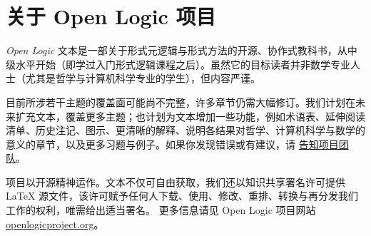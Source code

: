 \chapter*{关于 Open Logic 项目}


\textit{Open Logic} 文本是一部关于形式元逻辑与形式方法的开源、协作式教科书，从中级水平开始（即学过入门形式逻辑课程之后）。虽然它的目标读者并非数学专业人士（尤其是哲学与计算机科学专业的学生），但内容严谨。

目前所涉若干主题的覆盖面可能尚不完整，许多章节仍需大幅修订。我们计划在未来扩充文本，覆盖更多主题；也计划为文本增加一些功能，例如术语表、延伸阅读清单、历史注记、图示、更清晰的解释、说明各结果对哲学、计算机科学与数学的意义的章节，以及更多习题与例子。如果你发现错误或有建议，请
\href{https://github.com/OpenLogicProject/OpenLogic/wiki/Contributing}{告知项目团队}。

项目以开源精神运作。文本不仅可自由获取，我们还以知识共享署名许可提供 LaTeX 源文件，该许可赋予任何人下载、使用、修改、重排、转换与再分发我们工作的权利，唯需给出适当署名。
更多信息请见 Open Logic 项目网站
\href{http://openlogicproject.org/}{openlogicproject.org}。
